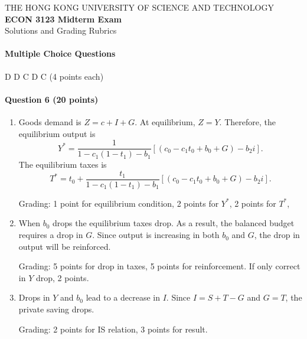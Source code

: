 \documentclass[12pt]{article}
\begin{document}
\thispagestyle{empty}

\begin{center}
    THE HONG KONG UNIVERSITY OF SCIENCE AND TECHNOLOGY\\
    {\large \textbf{ECON 3123 Midterm Exam}}\\
    Solutions and Grading Rubrics
\end{center}

\paragraph{Multiple Choice Questions} D D C D C (4 points each)

\paragraph{Question 6 (20 points)}
\begin{enumerate}[label=\alph*.]
	\item Goods demand is $Z=c+I+G$. At equilibrium, $Z=Y$. Therefore, the equilibrium output is
	\[Y^* = \frac{1}{1-c_1(1-t_1)-b_1}[(c_0-c_1t_0+b_0+G)-b_2 i].\]
	The equilibrium taxes is
	\[T^* = t_0 + \frac{t_1}{1-c_1(1-t_1)-b_1}[(c_0-c_1t_0+b_0+G)-b_2 i].\]

	Grading: 1 point for equilibrium condition, 2 points for $Y^*$, 2 points for $T^*$,

	\item When $b_0$ drops the equilibrium taxes drop. As a result, the balanced budget requires a drop in $G$. Since output is increasing in both $b_0$ and $G$, the drop in output will be reinforced.
	
	Grading: 5 points for drop in taxes, 5 points for reinforcement. If only correct in $Y$ drop, 2 points.

	\item Drops in $Y$ and $b_0$ lead to a decrease in $I$. Since $I = S+T-G$ and $G=T$, the private saving drops.
	
	Grading: 2 points for IS relation, 3 points for result.
\end{enumerate}
\end{document}
